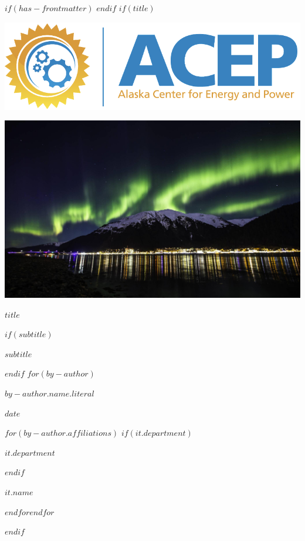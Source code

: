 $if(has-frontmatter)$
\frontmatter
$endif$
$if(title)$
\cleardoublepage
\thispagestyle{empty}
{\centering
\par\noindent\includegraphics[width=\textwidth]{images/ACEP_logo.png}
\par\noindent\includegraphics[width=\textwidth]{images/jnu_aurora.jpeg}
{\huge\bfseries $title$ \par}
$if(subtitle)$
{\Large $subtitle$ \par}
$endif$
\vspace{3ex}
$for(by-author)$
{\Large $by-author.name.literal$ \par}
\vspace{3ex}
{\bfseries\large $date$ \par}
\vspace{12ex}
$for(by-author.affiliations)$%
$if(it.department)$%
{\bfseries\large $it.department$ \par}
\vspace{3ex}
$endif$%
{\bfseries\large $it.name$ \par}
$endfor$$endfor$%
}
$endif$